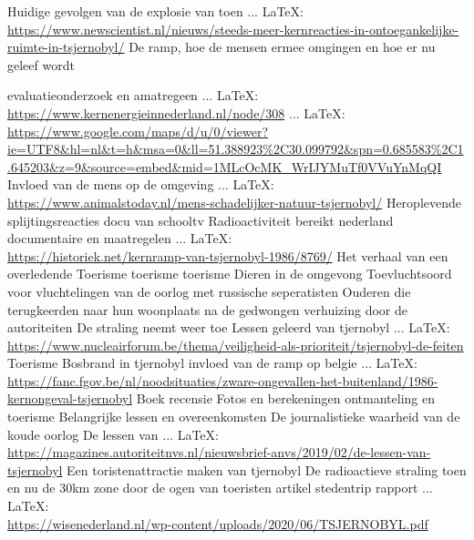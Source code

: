 \begin{thebibliography}{99}
{{{{{{{	Huidige gevolgen van de explosie van toen
	 ... \LaTeX:\\ \url{https://www.newscientist.nl/nieuws/steeds-meer-kernreacties-in-ontoegankelijke-ruimte-in-tsjernobyl/}
	De ramp, hoe de mensen ermee omgingen en hoe er nu geleef wordt
	
	evaluatieonderzoek en amatregeen
	 ... \LaTeX:\\ \url{https://www.kernenergieinnederland.nl/node/308}
	 ... \LaTeX:\\ \url{https://www.google.com/maps/d/u/0/viewer?ie=UTF8&hl=nl&t=h&msa=0&ll=51.388923%2C30.099792&spn=0.685583%2C1.645203&z=9&source=embed&mid=1MLcOcMK_WrIJYMuTf0VVuYnMqQI}
	Invloed van de mens op de omgeving
	 ... \LaTeX:\\ \url{https://www.animalstoday.nl/mens-schadelijker-natuur-tsjernobyl/}
	Heroplevende splijtingsreacties
	docu van schooltv
	Radioactiviteit bereikt nederland
	documentaire en maatregelen
	 ... \LaTeX:\\ \url{https://historiek.net/kernramp-van-tsjernobyl-1986/8769/}
	Het verhaal van een overledende
	Toerisme
	toerisme
	toerisme
	Dieren in de omgevong
	Toevluchtsoord voor vluchtelingen van de oorlog met russische seperatisten
	Ouderen die terugkeerden naar hun woonplaats na de gedwongen verhuizing door de autoriteiten
	De straling neemt weer toe
	Lessen geleerd van tjernobyl
	 ... \LaTeX:\\ \url{https://www.nucleairforum.be/thema/veiligheid-als-prioriteit/tsjernobyl-de-feiten}
	Toerisme
	Bosbrand in tjernobyl
	invloed van de ramp op belgie
	 ... \LaTeX:\\ \url{https://fanc.fgov.be/nl/noodsituaties/zware-ongevallen-het-buitenland/1986-kernongeval-tsjernobyl}
	Boek recensie
	Fotos en berekeningen
	ontmanteling en toerisme
	Belangrijke lessen en overeenkomsten
	De journalistieke waarheid van de koude oorlog
	De lessen van
	 ... \LaTeX:\\ \url{https://magazines.autoriteitnvs.nl/nieuwsbrief-anvs/2019/02/de-lessen-van-tsjernobyl}
	Een toristenattractie maken van tjernobyl
	De radioactieve straling toen en nu
	de 30km zone door de ogen van toeristen
	artikel
	stedentrip
	rapport
	 ... \LaTeX:\\ \url{https://wisenederland.nl/wp-content/uploads/2020/06/TSJERNOBYL.pdf}
}}}}}}}
\end{thebibliography}
